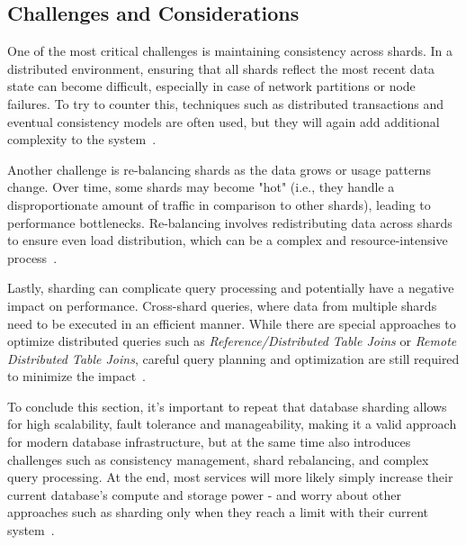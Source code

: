 \subsection{Challenges and Considerations}
One of the most critical challenges is maintaining consistency across shards. In a distributed environment, ensuring that all shards reflect the most recent data state can become difficult, especially in case of network partitions or node failures. To try to counter this, techniques such as distributed transactions and eventual consistency models are often used, but they will again add additional complexity to the system~\parencite{skyline_joins}.

Another challenge is re-balancing shards as the data grows or usage patterns change. Over time, some shards may become "hot" (i.e., they handle a disproportionate amount of traffic in comparison to other shards), leading to performance bottlenecks. Re-balancing involves redistributing data across shards to ensure even load distribution, which can be a complex and resource-intensive process~\parencite{db_sharding_cloud}.

Lastly, sharding can complicate query processing and potentially have a negative impact on performance. Cross-shard queries, where data from multiple shards need to be executed in an efficient manner. While there are special approaches to optimize distributed queries such as \textit{Reference/Distributed Table Joins} or \textit{Remote Distributed Table Joins}, careful query planning and optimization are still required to minimize the impact~\parencite{db_sharding_joins}.

To conclude this section, it's important to repeat that database sharding allows for high scalability, fault tolerance and manageability, making it a valid approach for modern database infrastructure, but at the same time also introduces challenges such as consistency management, shard rebalancing, and complex query processing. At the end, most services will more likely simply increase their current database's compute and storage power - and worry about other approaches such as sharding only when they reach a limit with their current system~\parencite{db_sharding_newsql}.   
